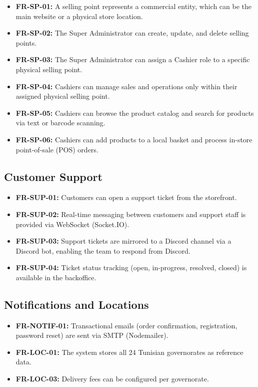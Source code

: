 \begin{itemize}
    \item \textbf{FR-SP-01:} A selling point represents a commercial entity, which can be the main website or a physical store location.
    \item \textbf{FR-SP-02:} The Super Administrator can create, update, and delete selling points.
    \item \textbf{FR-SP-03:} The Super Administrator can assign a Cashier role to a specific physical selling point.
    \item \textbf{FR-SP-04:} Cashiers can manage sales and operations only within their assigned physical selling point.
    \item \textbf{FR-SP-05:} Cashiers can browse the product catalog and search for products via text or barcode scanning.
    \item \textbf{FR-SP-06:} Cashiers can add products to a local basket and process in-store point-of-sale (POS) orders.
\end{itemize}

\subsection{Customer Support}

\begin{itemize}
    \item \textbf{FR-SUP-01:} Customers can open a support ticket from the storefront.
    \item \textbf{FR-SUP-02:} Real-time messaging between customers and support staff is provided via WebSocket (Socket.IO).
    \item \textbf{FR-SUP-03:} Support tickets are mirrored to a Discord channel via a Discord bot, enabling the team to respond from Discord.
    \item \textbf{FR-SUP-04:} Ticket status tracking (open, in-progress, resolved, closed) is available in the backoffice.
\end{itemize}

\subsection{Notifications and Locations}

\begin{itemize}
    \item \textbf{FR-NOTIF-01:} Transactional emails (order confirmation, registration, password reset) are sent via SMTP (Nodemailer).
    \item \textbf{FR-LOC-01:} The system stores all 24 Tunisian governorates as reference data.
    \item \textbf{FR-LOC-03:} Delivery fees can be configured per governorate.
\end{itemize}

